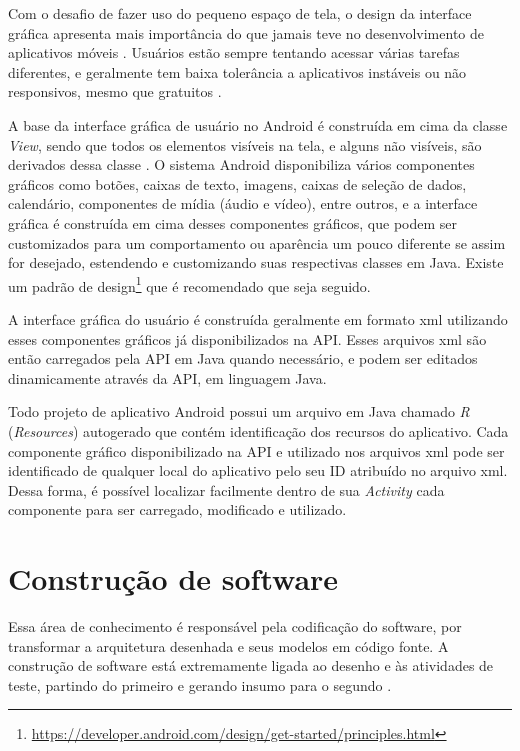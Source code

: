 Com o desafio de fazer uso do pequeno espaço de tela, o design da interface gráfica apresenta mais importância do que jamais teve no desenvolvimento de aplicativos móveis \cite{eswissues}. Usuários estão sempre tentando acessar várias tarefas diferentes, e geralmente tem baixa tolerância a aplicativos instáveis ou não responsivos, mesmo que gratuitos \cite{eswmobile}. 

A base da interface gráfica de usuário no Android é construída em cima da classe \textit{View}, sendo que todos os elementos visíveis na tela, e alguns não visíveis, são derivados dessa classe \cite{androidarch2010}. O sistema Android disponibiliza vários componentes gráficos como botões, caixas de texto, imagens, caixas de seleção de dados, calendário, componentes de mídia (áudio e vídeo), entre outros, e a interface gráfica é construída em cima desses componentes gráficos, que podem ser customizados para um comportamento ou aparência um pouco diferente se assim for desejado, estendendo e customizando suas respectivas classes em Java. Existe um padrão de design\footnote{\url{https://developer.android.com/design/get-started/principles.html}} que é recomendado que seja seguido.

A interface gráfica do usuário é construída geralmente em formato xml utilizando esses componentes gráficos já disponibilizados na API. Esses arquivos xml são então carregados pela API em Java quando necessário, e podem ser editados dinamicamente através da API, em linguagem Java.

Todo projeto de aplicativo Android possui um arquivo em Java chamado \textit{R} (\textit{Resources}) autogerado que contém identificação dos recursos do aplicativo. Cada componente gráfico disponibilizado na API e utilizado nos arquivos xml pode ser identificado de qualquer local do aplicativo pelo seu ID atribuído no arquivo xml. Dessa forma, é possível localizar facilmente dentro de sua \textit{Activity} cada componente para ser carregado, modificado e utilizado.

\section{Construção de software}

Essa área de conhecimento é responsável pela codificação do software, por transformar a arquitetura desenhada e seus modelos em código fonte. A construção de software está extremamente ligada ao desenho e às atividades de teste, partindo do primeiro e gerando insumo para o segundo \cite{swebok}.

